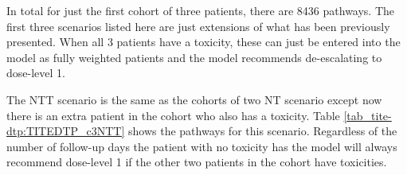 In total for just the first cohort of three patients, there are 8436 pathways. The first three scenarios listed here are just extensions of what has been previously presented. When all 3 patients have a toxicity, these can just be entered into the model as fully weighted patients and the model recommends de-escalating to dose-level 1. 

The NTT scenario is the same as the cohorts of two NT scenario except now there is an extra patient in the cohort who also has a toxicity. Table \ref{tab_tite-dtp:TITEDTP_c3NTT} shows the pathways for this scenario. Regardless of the number of follow-up days the patient with no toxicity has the model will always recommend dose-level 1 if the other two patients in the cohort have toxicities. 

\begin{table}[H]
	

\end{table}
